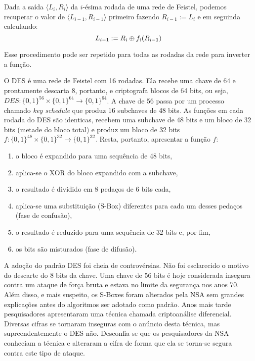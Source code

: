 Dada a saída $\langle L_i, R_i \rangle$ da $i$-ésima rodada de uma rede de Feistel, podemos recuperar o valor de $\langle L_{i-1}, R_{i-1} \rangle$ primeiro fazendo $R_{i-1} := L_i$ e em seguinda calculando:
\begin{displaymath}
  L_{i-1} := R_i \oplus f_i(R_{i-1})
\end{displaymath}

Esse procedimento pode ser repetido para todas as rodadas da rede para inverter a função.

O DES é uma rede de Feistel com 16 rodadas.
Ela recebe uma chave de 64 e prontamente descarta 8, portanto, e criptografa blocos de 64 bits, ou seja, $DES: \{0,1\}^{56} \times \{0,1\}^{64} \to \{0,1\}^{64}$.
A chave de 56 passa por um processo chamado {\em key schedule} que produz 16 subchaves de 48 bits.
As funções em cada rodada do DES são identicas, recebem uma subchave de 48 bits e um bloco de 32 bits (metade do bloco total) e produz um bloco de 32 bits $f: \{0,1\}^{48} \times \{0,1\}^{32} \to \{0,1\}^{32}$.
Resta, portanto, apresentar a função $f$:
\begin{enumerate}
\item o bloco é expandido para uma sequência de 48 bits,
\item aplica-se o XOR do bloco expandido com a subchave,
\item o resultado é dividido em 8 pedaços de 6 bits cada,
\item aplica-se uma substituição (S-Box) diferentes para cada um desses pedaços (fase de confusão),
\item o resultado é reduzido para uma sequência de 32 bits e, por fim,
\item os bits são misturados (fase de difusão).
\end{enumerate}

A adoção do padrão DES foi cheia de controvérsias.
Não foi esclarecido o motivo do descarte do 8 bits da chave.
Uma chave de 56 bits é hoje considerada insegura contra um ataque de força bruta e estava no limite da segurança nos anos 70.
Além disso, e mais suspeito, os S-Boxes foram alterados pela NSA sem grandes explicações antes do algoritmos ser adotado como padrão.
Anos mais tarde pesquisadores apresentaram uma técnica chamada criptoanálise diferencial.
Diversas cifras se tornaram inseguras com o anúncio desta técnica, mas supreendentemente o DES não.
Desconfia-se que os pesquisadores da NSA conheciam a técnica e alteraram a cifra de forma que ela se torna-se segura contra este tipo de ataque.

